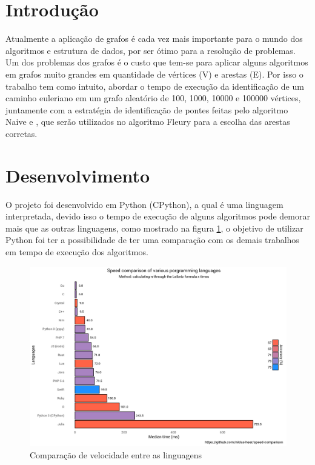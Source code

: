 \section{\esp Introdução}

Atualmente a aplicação de grafos é cada vez mais importante para o mundo dos algoritmos e estrutura de dados, por ser ótimo para a resolução de problemas. Um dos problemas dos grafos é o custo que tem-se para aplicar alguns algoritmos em grafos muito grandes em quantidade de vértices (V) e arestas (E). Por isso o trabalho tem como intuito, abordar o tempo de execução da identificação de um caminho euleriano em um grafo aleatório de 100, 1000, 10000 e 100000 vértices, juntamente com a estratégia de identificação de pontes feitas pelo algoritmo Naive e \cite{tarjan}, que serão utilizados no algoritmo Fleury para a escolha das arestas corretas. 

\section{\esp Desenvolvimento}
O projeto foi desenvolvido em Python (CPython), a qual é uma linguagem interpretada, devido isso o tempo de execução de alguns algoritmos pode demorar mais que as outras linguagens, como mostrado na figura \ref{fig:figure1}, o objetivo de utilizar Python foi ter a possibilidade de ter uma comparação com os demais trabalhos em tempo de execução dos algoritmos.

\begin{figure}[ht]
    \centering
    \includegraphics[width=.9\textwidth]{figuras/speed-comparision-programming.png}
    \caption{Comparação de velocidade entre as linguagens}
    \label{fig:figure1}
\end{figure}

